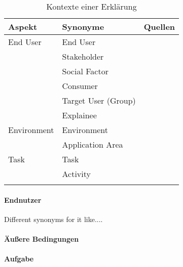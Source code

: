 \begin{longtable}{|p{}|p{}|p{}|}
    \hline
    \textbf{Aspekt} & \textbf{Synonyme} & \textbf{Quellen} \\ \hline
    End User        & End User & \cite{chazette2020explainability} \cite{kaptein_personalised_2017} \cite{sokol_one_2020} \\
                    & Stakeholder & \cite{chazette_knowledge_nodate} \\
                    & Social Factor & \cite{ehsan_human-centered_2020} \\
                    & Consumer & \cite{ehsan_human-centered_2020} \\
                    & Target User (Group) & \cite{chazette2020explainability} \cite{wiegand_id_2020} \\
                    & Explainee & \cite{chazette_knowledge_nodate} \cite{kohl_explainability_2019} \\
    \hline
    Environment     & Environment & \cite{chazette_knowledge_nodate} \cite{wiegand_id_2020} \cite{wiegand2019drive} \\
                    & Application Area & \cite{sokol_explainability_2020} \cite{wiegand2019drive} \cite{wiegand_id_2020} \\
    \hline
    Task            & Task & \cite{chazette_knowledge_nodate} \cite{sokol_explainability_2020} \cite{gunning2019darpa} \\
                    & Activity & \cite{wohlin2012experimentation} \\
                    
    \hline
\caption{Kontexte einer Erklärung}
\label{tab:impact_of_context_on_explanation}
\end{longtable}

\paragraph{Endnutzer}

Different synonyms for it like....

\paragraph{Äußere Bedingungen}

\paragraph{Aufgabe}

